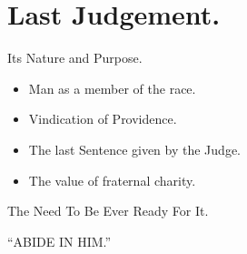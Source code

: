 \documentclass{beamer}
\begin{document}
\section{Last Judgement.}

\begin{frame}{Its Nature and Purpose.}
\begin{itemize}
\item Man as a member of the race.
\item Vindication of Providence.
\item The last Sentence given by the Judge.
\item The value of fraternal charity.
\end{itemize}
\end{frame}

\begin{frame}{The Need To Be Ever Ready For It.}
\begin{center}
``ABIDE IN HIM.''
\end{center}
\end{frame}
\end{document}
